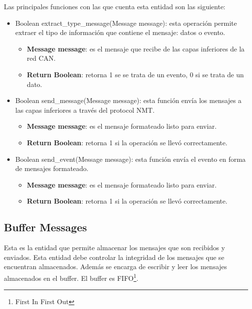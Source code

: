 Las principales funciones con las que cuenta esta entidad son las siguiente:
\begin{itemize}
  \item Boolean extract\_type\_message(Message message): esta operación permite
  extraer el tipo de información que contiene el mensaje: datos o evento.
  \begin{itemize}
  \item \textbf{Message message}: es el mensaje que recibe de las capas inferiores
    de la red CAN.
  \item \textbf{Return Boolean}: retorna 1 se se trata de un evento, 0 si se
    trata de un dato.
  \end{itemize}

\item Boolean send\_message(Message message): esta función envía los mensajes
  a las capas inferiores a través del protocol NMT.
  \begin{itemize}
  \item \textbf{Message message}: es el mensaje formateado listo para enviar.
  \item \textbf{Return Boolean}: retorna 1 si la operación se llevó
    correctamente.
  \end{itemize}
\item Boolean send\_event(Message message): esta función envía el evento en
  forma de mensajes formateado. 
    \begin{itemize}
  \item \textbf{Message message}: es el mensaje formateado listo para enviar.
  \item \textbf{Return Boolean}: retorna 1 si la operación se llevó
    correctamente.
  \end{itemize}
\end{itemize}

\subsection{Buffer Messages}
Esta es la entidad que permite almacenar los mensajes que son recibidos y
enviados. Esta entidad debe controlar la integridad de los mensajes que se
encuentran almacenados. Además se encarga de escribir y leer los mensajes
almacenados en el buffer. El buffer es FIFO\footnote{First In First Out}.

